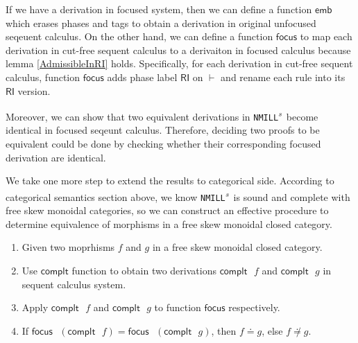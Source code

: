 \documentclass[submission,copyright,creativecommons]{eptcs}
\theoremstyle{definition}
\newcommand{\RI}{\mathsf{RI}}
\newcommand{\NMILL}{\texttt{NMILL}}
\newcommand{\SkNMILL}{\NMILL\textsuperscript{\textit{s}}}
\begin{document}
If we have a derivation in focused system, then we can define a function $\mathsf{emb}$ which erases phases and tags to obtain a derivation in original unfocused seqeuent calculus.
On the other hand, we can define a function $\mathsf{focus}$ to map each derivation in cut-free sequent calculus to a derivaiton in focused calculus because lemma \ref{AdmissibleInRI} holds.
Specifically, for each derivation in cut-free sequent calculus, function $\mathsf{focus}$ adds phase label $\RI$ on $\vdash$ and rename each rule into its $\RI$ version.

Moreover, we can show that two equivalent derivations in \SkNMILL\ become identical in focused seqeunt calculus.
Therefore, deciding two proofs to be equivalent could be done by checking whether their corresponding focused derivation are identical.

We take one more step to extend the results to categorical side.
According to categorical semantics section above, we know \SkNMILL\ is sound and complete with free skew monoidal categories, so we can construct an effective procedure to determine equivalence of morphisms in a free skew monoidal closed category.
\begin{enumerate}
  \item Given two moprhisms $f$ and $g$ in a free skew monoidal closed category.
  \item Use $\mathsf{complt}$ function to obtain two derivations $\mathsf{complt} \text{ } f$ and $\mathsf{complt} \text{ } g$ in sequent calculus system.
  \item Apply $\mathsf{complt} \text{ } f$ and $\mathsf{complt} \text{ } g$ to function $\mathsf{focus}$ respectively.
  \item If $\mathsf{focus} \text{ } (\mathsf{complt} \text{ } f) = \mathsf{focus} \text{ } (\mathsf{complt} \text{ } g)$, then $f \doteq g$, else $f \not\doteq g$.
\end{enumerate}
\end{document}

